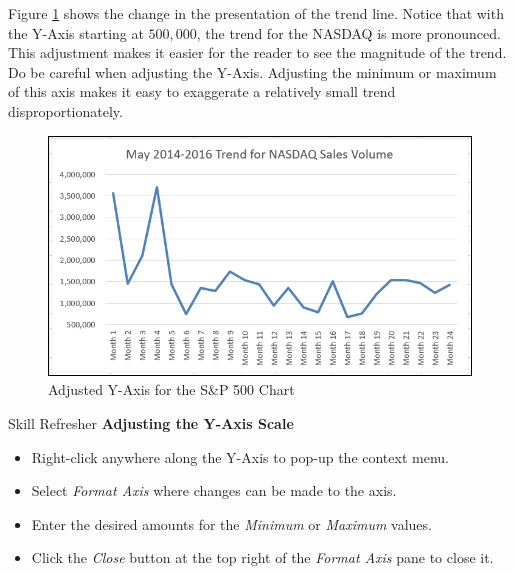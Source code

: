 Figure \ref{04:fig06} shows the change in the presentation of the trend line. Notice that with the Y-Axis starting at $ 500,000 $, the trend for the NASDAQ is more pronounced. This adjustment makes it easier for the reader to see the magnitude of the trend. Do be careful when adjusting the Y-Axis. Adjusting the minimum or maximum of this axis makes it easy to exaggerate a relatively small trend disproportionately.

\begin{figure}[H]
	\centering
	\includegraphics[width=\maxwidth{.95\linewidth}]{gfx/ch04_fig06}
	\caption{Adjusted Y-Axis for the S\&P 500 Chart}
	\label{04:fig06}
\end{figure}

\begin{center}
	\begin{sklbox}{Skill Refresher}
		\textbf{Adjusting the Y-Axis Scale}
		\\
		\begin{itemize}
			\setlength{\itemsep}{0pt}
			\setlength{\parskip}{0pt}
			\setlength{\parsep}{0pt}

			\item Right-click anywhere along the Y-Axis to pop-up the context menu.
			\item Select \textit{Format Axis} where changes can be made to the axis.
			\item Enter the desired amounts for the \textit{Minimum} or \textit{Maximum} values.
			\item Click the \textit{Close} button at the top right of the \textit{Format Axis} pane to close it.
			
		\end{itemize}
	\end{sklbox}
\end{center}

